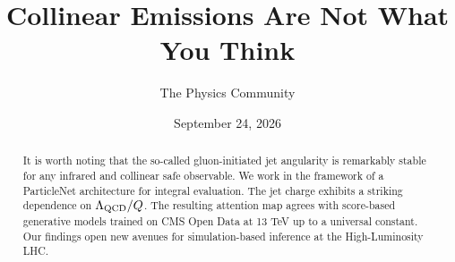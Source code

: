 \documentclass[11pt]{article}
\title{Collinear Emissions Are Not What You Think}
\author{The Physics Community}
\date{September 24, 2026}
\numberwithin{equation}{section}
\theoremstyle{definition}
\theoremstyle{remark}
\begin{document}
\maketitle
\begin{abstract}
It is worth noting that the so-called gluon-initiated jet angularity is
remarkably stable for any infrared and collinear safe observable. We
work in the framework of a ParticleNet architecture for integral
evaluation. The jet charge exhibits a striking dependence on
$\Lambda_{\rm QCD}/Q$. The resulting attention map agrees with
score-based generative models trained on CMS Open Data at 13 TeV up to a
universal constant. Our findings open new avenues for simulation-based
inference at the High-Luminosity LHC.
\end{abstract}
\tableofcontents





\nocite{*}


\end{document}
